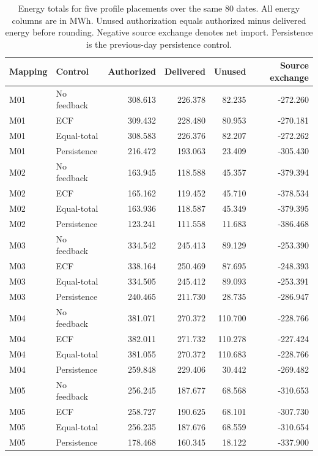 \begin{table}[!htbp]
\centering
\caption{Energy totals for five profile placements over the same 80 dates.
All energy columns are in MWh. Unused authorization equals authorized minus
delivered energy before rounding. Negative source exchange denotes net import.
Persistence is the previous-day persistence control.}
\label{tab:supp_mapping_energy}
\small
\begin{tabular}{@{}llrrrr@{}}
\toprule
Mapping & Control & Authorized & Delivered & Unused & Source exchange \\
\midrule
M01 & No feedback & 308.613 & 226.378 & 82.235 & -272.260 \\
M01 & ECF & 309.432 & 228.480 & 80.953 & -270.181 \\
M01 & Equal-total & 308.583 & 226.376 & 82.207 & -272.262 \\
M01 & Persistence & 216.472 & 193.063 & 23.409 & -305.430 \\
\addlinespace
M02 & No feedback & 163.945 & 118.588 & 45.357 & -379.394 \\
M02 & ECF & 165.162 & 119.452 & 45.710 & -378.534 \\
M02 & Equal-total & 163.936 & 118.587 & 45.349 & -379.395 \\
M02 & Persistence & 123.241 & 111.558 & 11.683 & -386.468 \\
\addlinespace
M03 & No feedback & 334.542 & 245.413 & 89.129 & -253.390 \\
M03 & ECF & 338.164 & 250.469 & 87.695 & -248.393 \\
M03 & Equal-total & 334.505 & 245.412 & 89.093 & -253.391 \\
M03 & Persistence & 240.465 & 211.730 & 28.735 & -286.947 \\
\addlinespace
M04 & No feedback & 381.071 & 270.372 & 110.700 & -228.766 \\
M04 & ECF & 382.011 & 271.732 & 110.278 & -227.424 \\
M04 & Equal-total & 381.055 & 270.372 & 110.683 & -228.766 \\
M04 & Persistence & 259.848 & 229.406 & 30.442 & -269.482 \\
\addlinespace
M05 & No feedback & 256.245 & 187.677 & 68.568 & -310.653 \\
M05 & ECF & 258.727 & 190.625 & 68.101 & -307.730 \\
M05 & Equal-total & 256.235 & 187.676 & 68.559 & -310.654 \\
M05 & Persistence & 178.468 & 160.345 & 18.122 & -337.900 \\
\bottomrule
\end{tabular}
\end{table}

